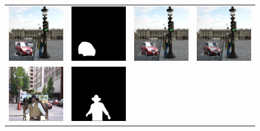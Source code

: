 \begin{figure}[h!]
\centering
\small
\begin{tabular}{cccc}
  \includegraphics[width=.24\textwidth]{figures/guided/000000026204_input.jpg}&
  \includegraphics[width=.24\textwidth]{figures/guided/000000026204_mask.jpg}&
  \includegraphics[width=.24\textwidth]{figures/guided/000000026204_inpainting.jpg}&
  \includegraphics[width=.24\textwidth]{figures/guided/000000026204_inpainting_harmonization.jpg} \\
  \includegraphics[width=.24\textwidth]{figures/guided/000000488251_input.jpg}&
  \includegraphics[width=.24\textwidth]{figures/guided/000000488251_mask.jpg}&

\end{tabular}
\end{figure}
